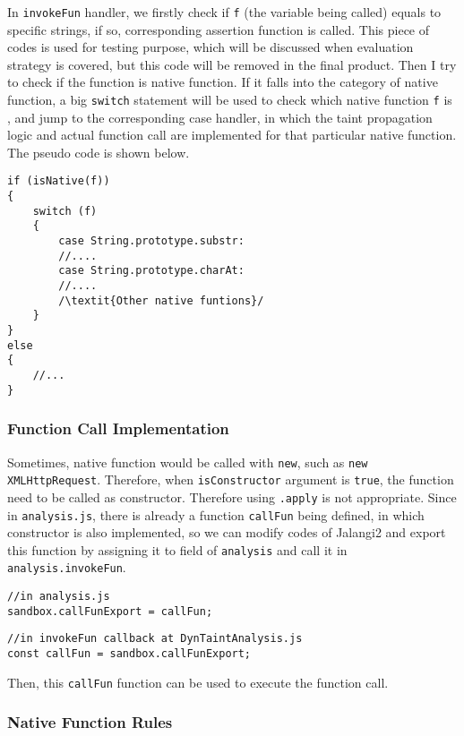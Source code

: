 {In \texttt{invokeFun} handler, we firstly check if \texttt{f} (the variable being called) equals to specific strings, if so, corresponding assertion function is called. This piece of codes is used for testing purpose, which will be discussed when evaluation strategy is covered, but this code will be removed in the final product. Then I try to check if the function is native function. If it falls into the category of native function, a big \texttt{switch} statement will be used to check which native function \texttt{f} is , and jump to the corresponding case handler, in which the taint propagation logic and actual function call are implemented for that particular native function. The pseudo code is shown below.

\begin{verbatim}
if (isNative(f))
{
    switch (f)
    {
        case String.prototype.substr:
        //....
        case String.prototype.charAt:
        //....
        /\textit{Other native funtions}/
    }
}
else
{
    //...
}
\end{verbatim}

\subsubsection{Function Call Implementation}

Sometimes, native function would be called with \texttt{new}, such as \texttt{new XMLHttpRequest}. Therefore, when \texttt{isConstructor} argument is \texttt{true}, the function need to be called as constructor. Therefore using \texttt{.apply} is not appropriate. Since in \texttt{analysis.js}, there is already a function \texttt{callFun} being defined, in which constructor is also implemented, so we can modify codes of Jalangi2 and export this function by assigning it to field of \texttt{analysis} and call it in \texttt{analysis.invokeFun}.

\begin{verbatim}
//in analysis.js
sandbox.callFunExport = callFun;
\end{verbatim}

\begin{verbatim}
//in invokeFun callback at DynTaintAnalysis.js
const callFun = sandbox.callFunExport;
\end{verbatim}

Then, this \texttt{callFun} function can be used to execute the function call.

\subsubsection{Native Function Rules}

}
